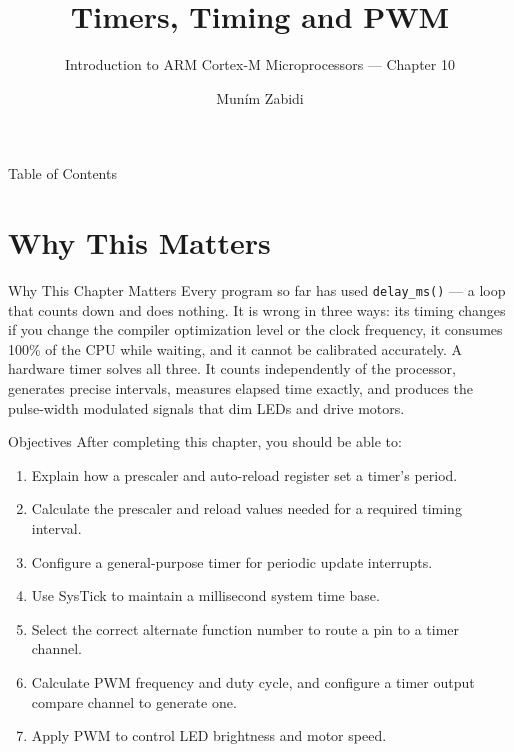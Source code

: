 \documentclass[aspectratio=169]{beamer}
\title{Timers, Timing and PWM}
\subtitle{Introduction to ARM Cortex-M Microprocessors --- Chapter 10}
\author{Mun\'im Zabidi}
\institute{Faculty of Electrical Engineering, Universiti Teknologi Malaysia}
\date{}
\begin{document}
\begin{frame}
  \titlepage
\end{frame}

\begin{frame}{Table of Contents}
  \tableofcontents
\end{frame}

\section{Why This Matters}

\begin{frame}{Why This Chapter Matters}
  Every program so far has used \texttt{delay\_ms()} --- a loop that counts
  down and does nothing. It is wrong in three ways: its timing changes if
  you change the compiler optimization level or the clock frequency, it
  consumes 100\% of the CPU while waiting, and it cannot be calibrated
  accurately. A hardware timer solves all three. It counts independently
  of the processor, generates precise intervals, measures elapsed time
  exactly, and produces the pulse-width modulated signals that dim LEDs
  and drive motors.
\end{frame}

\begin{frame}{Objectives}
  After completing this chapter, you should be able to:
  \begin{enumerate}
    \item Explain how a prescaler and auto-reload register set a timer's period.
    \item Calculate the prescaler and reload values needed for a required timing interval.
    \item Configure a general-purpose timer for periodic update interrupts.
    \item Use SysTick to maintain a millisecond system time base.
    \item Select the correct alternate function number to route a pin to a timer channel.
    \item Calculate PWM frequency and duty cycle, and configure a timer output compare channel to generate one.
    \item Apply PWM to control LED brightness and motor speed.
  \end{enumerate}
\end{frame}
\end{document}
